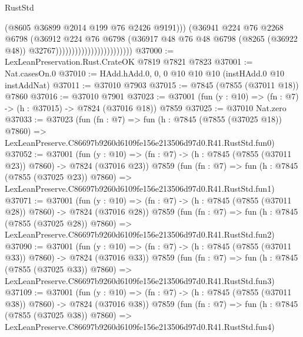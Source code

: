 \begin{lexlean}{RustStd}
\begin{coremodule}
                                                  (@8605 @36899 @2014 @199 @76 @2426 @9191)))
                                              (@36941
                                                @224
                                                @76
                                                @2268
                                                @6798
                                                (@36912
                                                  @224
                                                  @76
                                                  @6798
                                                  (@36917
                                                    @48
                                                    @76
                                                    @48
                                                    @6798
                                                    (@8265 (@36922 @48))
                                                    @32767))))))))))))))))))))))))
@37000 := LexLeanPreservation.Rust.CrateOK @7819 @7821 @7823
@37001 := Nat.casesOn.{0}
@37010 := HAdd.hAdd.{0, 0, 0} @10 @10 @10 (instHAdd.{0} @10 instAddNat)
@37011 := @37010 @7903
@37015 := @7845 (@7855 (@37011 @18)) @7860
@37016 := @37010 @7901
@37023 := @37001 (fun (y : @10) => (fn : @7) -> (h : @37015) -> @7824 (@37016 @18)) @7859
@37025 := @37010 Nat.zero
@37033 := @37023
    (fun (fn : @7) =>
    fun (h : @7845 (@7855 (@37025 @18)) @7860) =>
    LexLeanPreserve.C86697b9260d6109fe156e213506d97d0.R41.RustStd.fun0)
@37052 := @37001
    (fun (y : @10) => (fn : @7) -> (h : @7845 (@7855 (@37011 @23)) @7860) -> @7824 (@37016 @23))
    @7859
    (fun (fn : @7) =>
    fun (h : @7845 (@7855 (@37025 @23)) @7860) =>
    LexLeanPreserve.C86697b9260d6109fe156e213506d97d0.R41.RustStd.fun1)
@37071 := @37001
    (fun (y : @10) => (fn : @7) -> (h : @7845 (@7855 (@37011 @28)) @7860) -> @7824 (@37016 @28))
    @7859
    (fun (fn : @7) =>
    fun (h : @7845 (@7855 (@37025 @28)) @7860) =>
    LexLeanPreserve.C86697b9260d6109fe156e213506d97d0.R41.RustStd.fun2)
@37090 := @37001
    (fun (y : @10) => (fn : @7) -> (h : @7845 (@7855 (@37011 @33)) @7860) -> @7824 (@37016 @33))
    @7859
    (fun (fn : @7) =>
    fun (h : @7845 (@7855 (@37025 @33)) @7860) =>
    LexLeanPreserve.C86697b9260d6109fe156e213506d97d0.R41.RustStd.fun3)
@37109 := @37001
    (fun (y : @10) => (fn : @7) -> (h : @7845 (@7855 (@37011 @38)) @7860) -> @7824 (@37016 @38))
    @7859
    (fun (fn : @7) =>
    fun (h : @7845 (@7855 (@37025 @38)) @7860) =>
    LexLeanPreserve.C86697b9260d6109fe156e213506d97d0.R41.RustStd.fun4)

\end{coremodule}
\end{lexlean}
